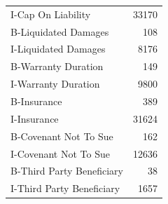 \begin{tabular}{lr}
I-Cap On Liability & 33170 \\
B-Liquidated Damages & 108 \\
I-Liquidated Damages & 8176 \\
B-Warranty Duration & 149 \\
I-Warranty Duration & 9800 \\
B-Insurance & 389 \\
I-Insurance & 31624 \\
B-Covenant Not To Sue & 162 \\
I-Covenant Not To Sue & 12636 \\
B-Third Party Beneficiary & 38 \\
I-Third Party Beneficiary & 1657 \\
\bottomrule
\end{tabular}
